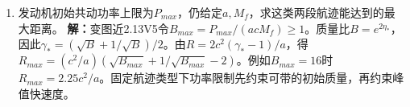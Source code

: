 \documentclass[UTF8,fontset=fandol,a4paper,11pt]{ctexart}
\begin{document}
\begin{enumerate}
\item 发动机初始共动功率上限为$P_{max}$，仍给定$a,M_f$，求这类两段航迹能达到的最大距离。
\textbf{解：}变图近2.13V5令$B_{max}=P_{max}/(acM_f)\ge1$。质量比$B=e^{2\eta_*}$，因此$\gamma_*=(\sqrt B+1/\sqrt B)/2$。由$R=2c^2(\gamma_*-1)/a$，得$R_{max}=(c^2/a)(\sqrt{B_{max}}+1/\sqrt{B_{max}}-2)$。例如$B_{max}=16$时$R_{max}=2.25c^2/a$。固定航迹类型下功率限制先约束可带的初始质量，再约束峰值快速度。
\begin{center}\begin{minipage}{.98\linewidth}\centering
{}
\end{minipage}
\end{center}
\end{enumerate}
\end{document}
